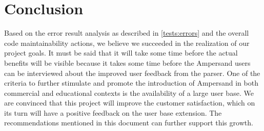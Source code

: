 
\section{Conclusion}
\label{sec:conclusion}
Based on the error result analysis as described in \autoref{tests:errors} and the overall code maintainability actions, we believe we succeeded in the realization of our project goals.
It must be said that it will take some time before the actual benefits will be visible because it takes some time before the Ampersand users can be interviewed about the improved user feedback from the parser.
One of the criteria to further stimulate and promote the introduction of Ampersand in both commercial and educational contexts is the availability of a large user base.
We are convinced that this project will improve the customer satisfaction, which on its turn will have a positive feedback on the user base extension.
The recommendations mentioned in this document can further support this growth.
